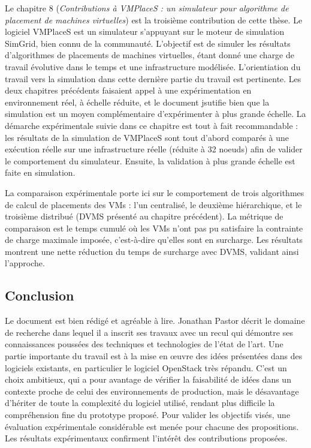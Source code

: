\documentclass[a4paper,12pt]{article}
\begin{document}
Le chapitre 8 (\emph{Contributions à VMPlaceS : un simulateur pour algorithme de
  placement  de machines  virtuelles}) est  la troisième  contribution de  cette
thèse.   Le logiciel  VMPlaceS est  un simulateur  s'appuyant sur  le moteur  de
simulation SimGrid, bien  connu de la communauté. L'objectif est  de simuler les
résultats d'algorithmes  de placements de  machines virtuelles, étant  donné une
charge  de travail  évolutive dans  le  temps et  une infrastructure  modélisée.
L'orientiation  du travail  vers la  simulation  dans cette  dernière partie  du
travail est  pertinente.  Les  deux chapitres précédents  faisaient appel  à une
expérimentation  en  environnement  réel,  à échelle  réduite,  et  le  document
jsutifie bien  que la  simulation est un  moyen complémentaire  d'expérimenter à
plus grande échelle. La démarche expérimentale  suivie dans ce chapitre est tout
à fait  recommandable :  les résultats  de la simulation  de VMPlaceS  sont tout
d'abord comparés à une exécution réelle sur une infrastructure réelle (réduite à
32 noeuds) afin de valider le comportement du simulateur. Ensuite, la validation
à plus grande échelle est faite en simulation.

La comparaison expérimentale porte ici  sur le comportement de trois algorithmes
de calcul de placements des VMs  : l'un centralisé, le deuxième hiérarchique, et
le troisième  distribué (DVMS  présenté au chapitre  précédent). La  métrique de
comparaison est le temps cumulé où les VMs n'ont pas pu satisfaire la contrainte
de  charge  maximale  imposée,  c'est-à-dire qu'elles  sont  en  surcharge.  Les
résultats montrent une nette réduction du temps de surcharge avec DVMS, validant
ainsi l'approche.



\subsection*{Conclusion}

Le  document est  bien rédigé  et agréable  à lire.   Jonathan Pastor  décrit le
domaine de  recherche dans  lequel il a  inscrit ses travaux  avec un  recul qui
démontre ses connaissances poussées des  techniques et technologies de l'état de
l'art. Une  partie importante du  travail est à la  mise en {\oe}uvre  des idées
présentées dans  des logiciels existants,  en particulier le  logiciel OpenStack
très répandu.   C'est un  choix ambitieux,  qui a pour  avantage de  vérifier la
faisabilité de  idées dans  un contexte  proche de  celui des  environnements de
production, mais  le désavantage  d'hériter de toute  la complexité  du logiciel
utilisé,  rendant plus  difficile la  compréhension fine  du prototype  proposé.
Pour valider les objectifs visés,  une évaluation expérimentale considérable est
menée  pour chacune  des  propositions. Les  résultats expérimentaux  confirment
l'intérêt des contributions proposées.
\end{document}
